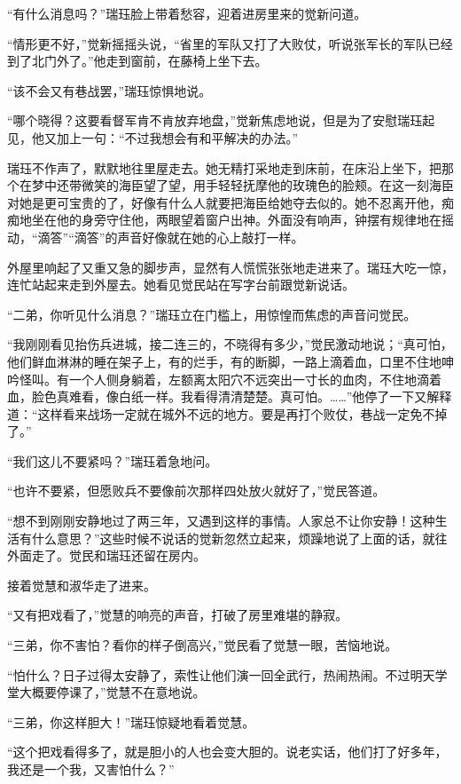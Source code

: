 \par “有什么消息吗？”瑞珏脸上带着愁容，迎着进房里来的觉新问道。
\par “情形更不好，”觉新摇摇头说，“省里的军队又打了大败仗，听说张军长的军队已经到了北门外了。”他走到窗前，在藤椅上坐下去。
\par “该不会又有巷战罢，”瑞珏惊惧地说。
\par “哪个晓得？这要看督军肯不肯放弃地盘，”觉新焦虑地说，但是为了安慰瑞珏起见，他又加上一句：“不过我想会有和平解决的办法。”
\par 瑞珏不作声了，默默地往里屋走去。她无精打采地走到床前，在床沿上坐下，把那个在梦中还带微笑的海臣望了望，用手轻轻抚摩他的玫瑰色的脸颊。在这一刻海臣对她是更可宝贵的了，好像有什么人就要把海臣给她夺去似的。她不忍离开他，痴痴地坐在他的身旁守住他，两眼望着窗户出神。外面没有响声，钟摆有规律地在摇动，“滴答”“滴答”的声音好像就在她的心上敲打一样。
\par 外屋里响起了又重又急的脚步声，显然有人慌慌张张地走进来了。瑞珏大吃一惊，连忙站起来走到外屋去。她看见觉民站在写字台前跟觉新说话。
\par “二弟，你听见什么消息？”瑞珏立在门槛上，用惊惶而焦虑的声音问觉民。
\par “我刚刚看见抬伤兵进城，接二连三的，不晓得有多少，”觉民激动地说；“真可怕，他们鲜血淋淋的睡在架子上，有的烂手，有的断脚，一路上滴着血，口里不住地呻吟怪叫。有一个人侧身躺着，左额离太阳穴不远突出一寸长的血肉，不住地滴着血，脸色真难看，像白纸一样。我看得清清楚楚。真可怕。……”他停了一下又解释道：“这样看来战场一定就在城外不远的地方。要是再打个败仗，巷战一定免不掉了。”
\par “我们这儿不要紧吗？”瑞珏着急地问。
\par “也许不要紧，但愿败兵不要像前次那样四处放火就好了，”觉民答道。
\par “想不到刚刚安静地过了两三年，又遇到这样的事情。人家总不让你安静！这种生活有什么意思？”这些时候不说话的觉新忽然立起来，烦躁地说了上面的话，就往外面走了。觉民和瑞珏还留在房内。
\par 接着觉慧和淑华走了进来。
\par “又有把戏看了，”觉慧的响亮的声音，打破了房里难堪的静寂。
\par “三弟，你不害怕？看你的样子倒高兴，”觉民看了觉慧一眼，苦恼地说。
\par “怕什么？日子过得太安静了，索性让他们演一回全武行，热闹热闹。不过明天学堂大概要停课了，”觉慧不在意地说。
\par “三弟，你这样胆大！”瑞珏惊疑地看着觉慧。
\par “这个把戏看得多了，就是胆小的人也会变大胆的。说老实话，他们打了好多年，我还是一个我，又害怕什么？”
